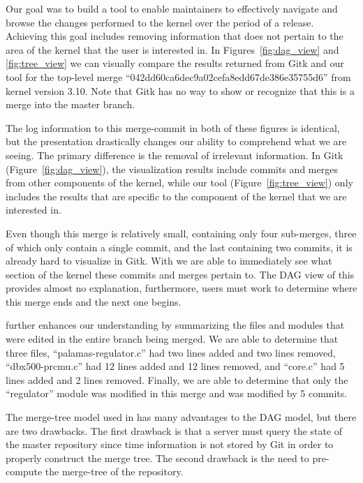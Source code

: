 \documentclass[conference, draftclsnofoot, draft]{IEEEtran}
\begin{document}
Our goal was to build a tool to enable maintainers to effectively navigate and
browse the changes performed to the kernel over the period of a release. Achieving
this goal includes removing information that does not pertain to the area of the
kernel that the user is interested in. In Figures~\ref{fig:dag_view} and
\ref{fig:tree_view} we can visually compare the results returned from Gitk
and our tool for the top-level merge ``042dd60ca6dec9a02cefa8edd67de386e35755d6''
from kernel version 3.10. Note that Gitk has no way to show or recognize that this
is a merge into the master branch.

The log information to this merge-commit in both of these figures is identical, but
the presentation drastically changes our ability to comprehend what we are seeing.
The primary difference is the removal of irrelevant information. In Gitk
(Figure~\ref{fig:dag_view}), the visualization results include commits and merges
from other components of the kernel, while our tool (Figure~\ref{fig:tree_view})
only includes the results that are specific to the component of the kernel that we
are interested in.

Even though this merge is relatively small, containing only four sub-merges, three of which
only contain a single commit, and the last containing two commits, it is already hard to visualize in Gitk. 
With \tool we are able to immediately see what section of the kernel these commits and merges pertain to. The DAG view of this provides almost no explanation,
furthermore, users must work to determine where this merge ends and the next one
begins.

\tool further enhances our understanding by summarizing the files
and modules that were edited in the entire branch being merged. We are able to determine that three
files, ``palamas-regulator.c'' had two lines added and two lines removed,
``dbx500-prcmu.c'' had 12 lines added and 12 lines removed, and ``core.c'' had 5
lines added and 2 lines removed. Finally, we are able to determine that only the
``regulator'' module was modified in this merge and was modified by 5 commits.


The merge-tree model used in \tool has many advantages to the DAG model, but there
are two drawbacks. The first drawback is that a server must query the state of the
master repository since time information is not stored by Git in order to properly
construct the merge tree. The second drawback is the need to pre-compute the
merge-tree of the repository.

\end{document}
